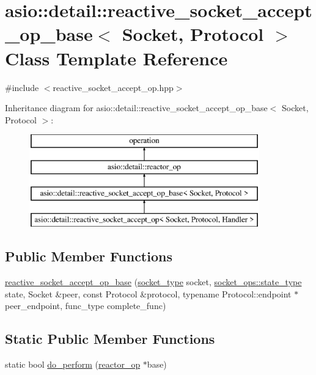 \hypertarget{classasio_1_1detail_1_1reactive__socket__accept__op__base}{}\section{asio\+:\+:detail\+:\+:reactive\+\_\+socket\+\_\+accept\+\_\+op\+\_\+base$<$ Socket, Protocol $>$ Class Template Reference}
\label{classasio_1_1detail_1_1reactive__socket__accept__op__base}


{\ttfamily \#include $<$reactive\+\_\+socket\+\_\+accept\+\_\+op.\+hpp$>$}

Inheritance diagram for asio\+:\+:detail\+:\+:reactive\+\_\+socket\+\_\+accept\+\_\+op\+\_\+base$<$ Socket, Protocol $>$\+:\begin{figure}[H]
\begin{center}
\leavevmode
\includegraphics[height=4.000000cm]{classasio_1_1detail_1_1reactive__socket__accept__op__base}
\end{center}
\end{figure}
\subsection*{Public Member Functions}
\begin{DoxyCompactItemize}
\item 
\hyperlink{classasio_1_1detail_1_1reactive__socket__accept__op__base_a811f515a0346820671f1774bb27855a0}{reactive\+\_\+socket\+\_\+accept\+\_\+op\+\_\+base} (\hyperlink{namespaceasio_1_1detail_a6798c771dd84b79798b1a08150706ea9}{socket\+\_\+type} socket, \hyperlink{namespaceasio_1_1detail_1_1socket__ops_a5ce32ee297edef8833113ea35a933054}{socket\+\_\+ops\+::state\+\_\+type} state, Socket \&peer, const Protocol \&protocol, typename Protocol\+::endpoint $\ast$peer\+\_\+endpoint, func\+\_\+type complete\+\_\+func)
\end{DoxyCompactItemize}
\subsection*{Static Public Member Functions}
\begin{DoxyCompactItemize}
\item 
static bool \hyperlink{classasio_1_1detail_1_1reactive__socket__accept__op__base_ad3cbe11e482745edaf1b099956239998}{do\+\_\+perform} (\hyperlink{classasio_1_1detail_1_1reactor__op}{reactor\+\_\+op} $\ast$base)
\end{DoxyCompactItemize}
